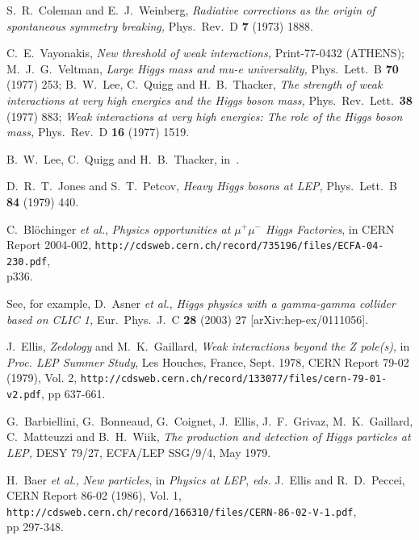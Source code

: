 \documentclass[12pt]{article}
\numberwithin{equation}{section}
\begin{document}
\begin{thebibliography}{99}
S.~R.~Coleman and E.~J.~Weinberg,
{\it Radiative corrections as the origin of spontaneous symmetry breaking,}
  Phys.\ Rev.\ D {\bf 7} (1973) 1888.

C.~E.~Vayonakis,
{\it New threshold of weak interactions,}
  Print-77-0432 (ATHENS);
   M.~J.~G.~Veltman,
{\it Large Higgs mass and mu-e universality,}
  Phys.\ Lett.\ B {\bf 70} (1977) 253;
B.~W.~Lee, C.~Quigg and H.~B.~Thacker,
{\it The strength of weak interactions at very high energies and the Higgs boson mass,}
  Phys.\ Rev.\ Lett.\  {\bf 38} (1977) 883;
  {\it Weak interactions at very high energies: The role of the Higgs boson mass,}
  Phys.\ Rev.\  D {\bf 16} (1977) 1519.
  
B.~W.~Lee, C.~Quigg and H.~B.~Thacker, in~\cite{heavyH}.

D.~R.~T.~Jones and S.~T.~Petcov,
{\it Heavy Higgs bosons at LEP,}
  Phys.\ Lett.\  B {\bf 84} (1979) 440.

C.~Bl\"ochinger {\it et al.}, {\it Physics opportunities at $\mu^+ \mu^-$ Higgs Factories}, in
CERN Report 2004-002,
{\tt http://cdsweb.cern.ch/record/735196/files/ECFA-04-230.pdf}, \\ p336.

See, for example,
D.~Asner {\it et al.},
{\it Higgs physics with a gamma-gamma collider based on CLIC 1,}
  Eur.\ Phys.\ J.\  C {\bf 28} (2003) 27
  [arXiv:hep-ex/0111056].

J.~Ellis, {\it Zedology} and M.~K.~Gaillard, {\it Weak interactions beyond the Z pole(s)}, in {\it Proc. LEP Summer Study}, Les Houches, France, Sept. 1978, CERN Report 79-02 (1979), Vol. 2, 
{\tt http://cdsweb.cern.ch/record/133077/files/cern-79-01-v2.pdf}, pp 637-661.

G.~Barbiellini, G.~Bonneaud, G.~Coignet, J.~Ellis, J.~F.~Grivaz, M.~K.~Gaillard, C.~Matteuzzi and B.~H.~Wiik,
{\it The production and detection of Higgs particles at LEP,} DESY 79/27, ECFA/LEP SSG/9/4, May 1979.
  
H.~Baer {\it et al.}, {\it New particles}, in {\it Physics at LEP}, 
{\it eds.} J.~Ellis and R.~D.~Peccei, CERN Report 86-02 (1986), Vol. 1, \\
{\tt http://cdsweb.cern.ch/record/166310/files/CERN-86-02-V-1.pdf}, \\ pp 297-348. 


\end{thebibliography}
\end{document}
